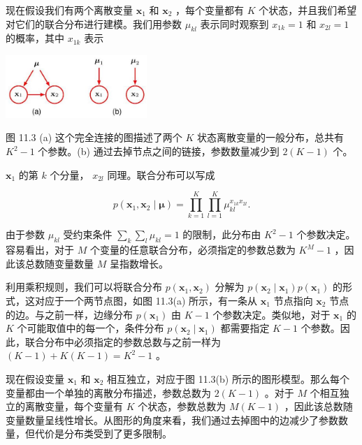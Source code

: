 \documentclass[10pt]{report}
\begin{document}
现在假设我们有两个离散变量 \({\mathbf{x}}_{1}\) 和 \({\mathbf{x}}_{2}\) ，每个变量都有 \(K\) 个状态，并且我们希望对它们的联合分布进行建模。我们用参数 \({\mu }_{kl}\) 表示同时观察到 \({x}_{1k} = 1\) 和 \({x}_{2l} = 1\) 的概率，其中 \({x}_{1k}\) 表示

\begin{center}
\includegraphics[max width=0.4\textwidth]{images/0194e279-9b28-703a-88f4-c3ac21e2010d_349_919_353_509_227_0.jpg}
\end{center}
\hspace*{3em} 

图 11.3 (a) 这个完全连接的图描述了两个 \(K\) 状态离散变量的一般分布，总共有 \({K}^{2} - 1\) 个参数。(b) 通过去掉节点之间的链接，参数数量减少到 \(2\left( {K - 1}\right)\) 个。

\({\mathbf{x}}_{1}\) 的第 \(k\) 个分量， \({x}_{2l}\) 同理。联合分布可以写成

\[
p\left( {{\mathbf{x}}_{1},{\mathbf{x}}_{2} \mid  \mathbf{\mu }}\right)  = \mathop{\prod }\limits_{{k = 1}}^{K}\mathop{\prod }\limits_{{l = 1}}^{K}{\mu }_{kl}^{{x}_{1k}{x}_{2l}}.
\]

由于参数 \({\mu }_{kl}\) 受约束条件 \(\mathop{\sum }\limits_{k}\mathop{\sum }\limits_{l}{\mu }_{kl} = 1\) 的限制，此分布由 \({K}^{2} - 1\) 个参数决定。容易看出，对于 \(M\) 个变量的任意联合分布，必须指定的参数总数为 \({K}^{M} - 1\) ，因此该总数随变量数量 \(M\) 呈指数增长。

利用乘积规则，我们可以将联合分布 \(p\left( {{\mathbf{x}}_{1},{\mathbf{x}}_{2}}\right)\) 分解为 \(p\left( {{\mathbf{x}}_{2} \mid  {\mathbf{x}}_{1}}\right) p\left( {\mathbf{x}}_{1}\right)\) 的形式，这对应于一个两节点图，如图 11.3(a) 所示，有一条从 \({\mathbf{x}}_{1}\) 节点指向 \({\mathbf{x}}_{2}\) 节点的边。与之前一样，边缘分布 \(p\left( {\mathbf{x}}_{1}\right)\) 由 \(K - 1\) 个参数决定。类似地，对于 \({\mathbf{x}}_{1}\) 的 \(K\) 个可能取值中的每一个，条件分布 \(p\left( {{\mathbf{x}}_{2} \mid  {\mathbf{x}}_{1}}\right)\) 都需要指定 \(K - 1\) 个参数。因此，联合分布中必须指定的参数总数与之前一样为 \(\left( {K - 1}\right)  + K\left( {K - 1}\right)  = {K}^{2} - 1\) 。

现在假设变量 \({\mathbf{x}}_{1}\) 和 \({\mathbf{x}}_{2}\) 相互独立，对应于图 11.3(b) 所示的图形模型。那么每个变量都由一个单独的离散分布描述，参数总数为 \(2\left( {K - 1}\right)\) 。对于 \(M\) 个相互独立的离散变量，每个变量有 \(K\) 个状态，参数总数为 \(M\left( {K - 1}\right)\) ，因此该总数随变量数量呈线性增长。从图形的角度来看，我们通过去掉图中的边减少了参数数量，但代价是分布类受到了更多限制。
\end{document}
